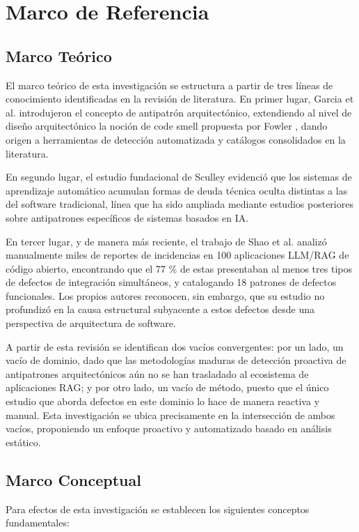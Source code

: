 \section{Marco de Referencia}
 
\subsection{Marco Teórico}
 
El marco teórico de esta investigación se estructura a partir de tres líneas de conocimiento identificadas en la revisión de literatura. En primer lugar, Garcia et al. \cite{garcia_identifying_2009}  introdujeron el concepto de antipatrón arquitectónico, extendiendo al nivel de diseño arquitectónico la noción de code smell propuesta por Fowler \cite{fowler_1999}, dando origen a herramientas de detección automatizada y catálogos consolidados en la literatura.

En segundo lugar, el estudio fundacional de Sculley \cite{sculley_hidden_2015} evidenció que los sistemas de aprendizaje automático acumulan formas de deuda técnica oculta distintas a las del software tradicional, línea que ha sido ampliada mediante estudios posteriores sobre antipatrones específicos de sistemas basados en IA.

En tercer lugar, y de manera más reciente, el trabajo de Shao et al. \cite{shao_are_2024} analizó manualmente miles de reportes de incidencias en 100 aplicaciones LLM/RAG de código abierto, encontrando que el 77 \% de estas presentaban al menos tres tipos de defectos de integración simultáneos, y catalogando 18 patrones de defectos funcionales. Los propios autores reconocen, sin embargo, que su estudio no profundizó en la causa estructural subyacente a estos defectos desde una perspectiva de arquitectura de software.

A partir de esta revisión se identifican dos vacíos convergentes: por un lado, un vacío de dominio, dado que las metodologías maduras de detección proactiva de antipatrones arquitectónicos aún no se han trasladado al ecosistema de aplicaciones RAG; y por otro lado, un vacío de método, puesto que el único estudio que aborda defectos en este dominio \cite{shao_are_2024} lo hace de manera reactiva y manual. Esta investigación se ubica precisamente en la intersección de ambos vacíos, proponiendo un enfoque proactivo y automatizado basado en análisis estático.

\subsection{Marco Conceptual}
 Para efectos de esta investigación se establecen los siguientes conceptos fundamentales:

